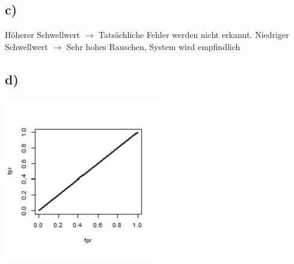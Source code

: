 \subsection*{c)}
Höherer Schwellwert $\rightarrow $ Tatsächliche Fehler werden nicht erkannt.
Niedriger Schwellwert $\rightarrow$ Sehr hohes Rauschen, System wird empfindlich
\subsection*{d)}
\centering
\includegraphics{../4/Screenshots/random.png}